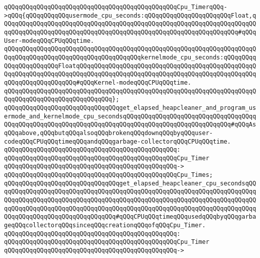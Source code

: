 \verb|qQQqqQQqqQQqqQQqqQQqqQQqqQQqqQQqqQQqqQQqqQQqqQQqCpu_TimerqQQq->qQQq{qQQqqQQqqQQqusermode_cpu_seconds:qQQqqQQqqQQqqQQqqQQqqQQqFloat,qQQqqQQqqQQqqQQqqQQqqQQqqQQqqQQqqQQqqQQqqQQqqQQqqQQqqQQqqQQqqQQqqQQqqQQqqQQqqQQqqQQqqQQqqQQqqQQqqQQqqQQqqQQqqQQqqQQqqQQqqQQqqQQqqQQqqQQq#qQQqUser-modeqQQqCPUqQQqtime.|\newline
\verb|qQQqqQQqqQQqqQQqqQQqqQQqqQQqqQQqqQQqqQQqqQQqqQQqqQQqqQQqqQQqqQQqqQQqqQQqqQQqqQQqqQQqqQQqqQQqqQQqqQQqqQQqqQQqkernelmode_cpu_seconds:qQQqqQQqqQQqqQQqqQQqqQQqFloatqQQqqQQqqQQqqQQqqQQqqQQqqQQqqQQqqQQqqQQqqQQqqQQqqQQqqQQqqQQqqQQqqQQqqQQqqQQqqQQqqQQqqQQqqQQqqQQqqQQqqQQqqQQqqQQqqQQqqQQqqQQqqQQqqQQqqQQqqQQq#qQQqKernel-modeqQQqCPUqQQqtime.|\newline
\verb|qQQqqQQqqQQqqQQqqQQqqQQqqQQqqQQqqQQqqQQqqQQqqQQqqQQqqQQqqQQqqQQqqQQqqQQqqQQqqQQqqQQqqQQqqQQqqQQqqQQq};|\newline
\newline
\verb|qQQqqQQqqQQqqQQqqQQqqQQqqQQqqQQqget_elapsed_heapcleaner_and_program_usermode_and_kernelmode_cpu_secondsqQQqqQQqqQQqqQQqqQQqqQQqqQQqqQQqqQQqqQQqqQQqqQQqqQQqqQQqqQQqqQQqqQQqqQQqqQQqqQQqqQQqqQQqqQQqqQQqqQQq#qQQqAsqQQqabove,qQQqbutqQQqalsoqQQqbrokenqQQqdownqQQqbyqQQquser-codeqQQqCPUqQQqtimeqQQqandqQQqgarbage-collectorqQQqCPUqQQqtime.|\newline
\verb|qQQqqQQqqQQqqQQqqQQqqQQqqQQqqQQqqQQqqQQqqQQqqQQq:|\newline
\verb|qQQqqQQqqQQqqQQqqQQqqQQqqQQqqQQqqQQqqQQqqQQqqQQqCpu_Timer|\newline
\verb|qQQqqQQqqQQqqQQqqQQqqQQqqQQqqQQqqQQqqQQqqQQqqQQq->|\newline
\verb|qQQqqQQqqQQqqQQqqQQqqQQqqQQqqQQqqQQqqQQqqQQqqQQqCpu_Times;|\newline
\newline
\verb|qQQqqQQqqQQqqQQqqQQqqQQqqQQqqQQqget_elapsed_heapcleaner_cpu_secondsqQQqqQQqqQQqqQQqqQQqqQQqqQQqqQQqqQQqqQQqqQQqqQQqqQQqqQQqqQQqqQQqqQQqqQQqqQQqqQQqqQQqqQQqqQQqqQQqqQQqqQQqqQQqqQQqqQQqqQQqqQQqqQQqqQQqqQQqqQQqqQQqqQQqqQQqqQQqqQQqqQQqqQQqqQQqqQQqqQQqqQQqqQQqqQQqqQQqqQQqqQQqqQQqqQQqqQQqqQQqqQQqqQQqqQQqqQQqqQQqqQQq#qQQqCPUqQQqtimeqQQqusedqQQqbyqQQqgarbageqQQqcollectorqQQqsinceqQQqcreationqQQqofqQQqCpu_Timer.|\newline
\verb|qQQqqQQqqQQqqQQqqQQqqQQqqQQqqQQqqQQqqQQqqQQqqQQq:|\newline
\verb|qQQqqQQqqQQqqQQqqQQqqQQqqQQqqQQqqQQqqQQqqQQqqQQqCpu_Timer|\newline
\verb|qQQqqQQqqQQqqQQqqQQqqQQqqQQqqQQqqQQqqQQqqQQqqQQq->|\newline
